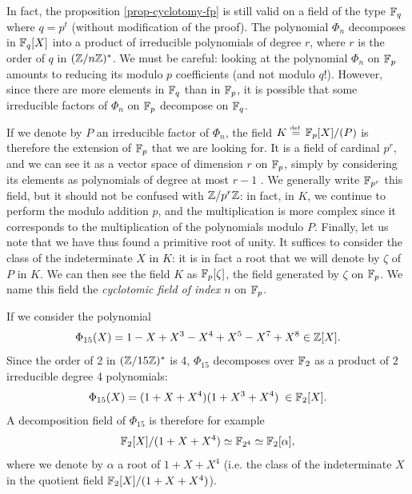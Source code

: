  
\begin{rem}
In fact, the proposition \ref{prop-cyclotomy-fp} is still valid on a field of the type $ \mathbb{F}_q $ where $ q = p^t $ (without modification of the proof). The polynomial $ \Phi_n $ decomposes in $ \mathbb{F}_q [X] $ into a product of irreducible polynomials of degree $ r $, where $ r $ is the order of $ q $ in $ (\mathbb{Z}/n \mathbb{Z})^* $. We must be careful: looking at the polynomial $ \Phi_n $ on $ \mathbb{F}_p $ amounts to reducing its modulo $ p $ coefficients (and not modulo $ q $!). However, since there are more elements in $ \mathbb{F}_q $ than in $ \mathbb{F}_p $, it is possible that some irreducible factors of $ \Phi_n $ on $ \mathbb{F}_p $ decompose on $ \mathbb{F}_q $.
\end{rem}
 
 
 
If we denote by $ P $ an irreducible factor of $ \Phi_n $, the field $ K \stackrel{\mbox{\upshape\tiny def.}}{=} \mathbb{F}_p [X] / (P) $ is therefore the extension of $ \mathbb{F}_p $ that we are looking for. It is a field of cardinal $ p^r $, and we can see it as a vector space of dimension $ r $ on $ \mathbb{F}_p $, simply by considering its elements as polynomials of degree at most $ r-1 $ . We generally write $ \mathbb{F}_{p^r} $ this field, but it should not be confused with $ \mathbb{Z}/p^r \mathbb{Z} $: in fact, in $ K $, we continue to perform the modulo addition $ p $, and the multiplication is more complex since it corresponds to the multiplication of the polynomials modulo $ P $. Finally, let us note that we have thus found a primitive root of unity. It suffices to consider the class of the indeterminate $ X $ in $ K $: it is in fact a root that we will denote by $ \zeta $ of $ P $ in $ K $. We can then see the field $ K $ as $ \mathbb{F}_p [\zeta] $, the field generated by $ \zeta $ on $ \mathbb{F}_p $. We name this field the \textit{cyclotomic field of index $ n $} on $ \mathbb{F}_p $.
 
\begin{exmp}
 If we consider the polynomial
\begin{equation*}
\Phi_{15} (X) = 1 - X + X^3 - X^4 + X^5 - X^7 + X^8 \in \mathbb{Z} [X].
\end{equation*}
Since the order of 2 in $ (\mathbb{Z}/15 \mathbb{Z})^* $ is 4, $ \Phi_{15} $ decomposes over $ \mathbb{F}_2 $ as a product of 2 irreducible degree 4 polynomials:
\begin{equation*}
\Phi_{15} (X) = (1 + X + X^4) (1 + X^3 + X^4) \; \in \mathbb{F}_2 [X].
\end{equation*}
A decomposition field of $ \Phi_{15} $ is therefore for example
\begin{equation*}
\mathbb{F}_2 [X] / (1 + X + X^4) \simeq \mathbb{F}_{2^4} \simeq \mathbb{F}_2 [\alpha],
\end{equation*}
where we denote by $ \alpha $ a root of $ 1 + X + X^4 $ (i.e. the class of the indeterminate $ X $ in the quotient field $ \mathbb{F}_2 [X] / ( 1 + X + X^4) $).
\end{exmp}
 
